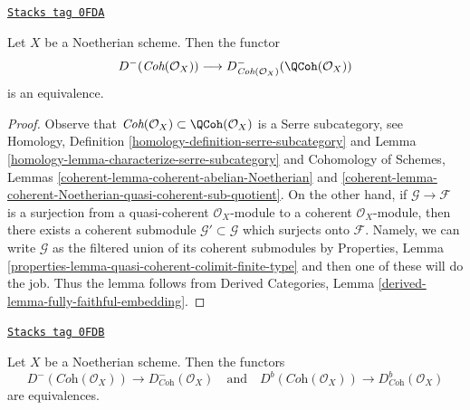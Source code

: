 \begin{lemma}
\label{perfect-lemma-coh-to-qcoh}
\href{https://stacks.math.columbia.edu/tag/0FDA}{\texttt{Stacks tag 0FDA}}

Let $X$ be a Noetherian scheme. Then the functor
$$
D^-(\textit{Coh}(\mathcal{O}_X))
\longrightarrow
D^-_{\textit{Coh}(\mathcal{O}_X)}(\QCoh(\mathcal{O}_X))
$$
is an equivalence.
\end{lemma}

\begin{proof}
Observe that $\textit{Coh}(\mathcal{O}_X) \subset \QCoh(\mathcal{O}_X)$
is a Serre subcategory, see
Homology, Definition \ref{homology-definition-serre-subcategory} and
Lemma \ref{homology-lemma-characterize-serre-subcategory} and
Cohomology of Schemes, Lemmas
\ref{coherent-lemma-coherent-abelian-Noetherian} and
\ref{coherent-lemma-coherent-Noetherian-quasi-coherent-sub-quotient}.
On the other hand, if $\mathcal{G} \to \mathcal{F}$ is a surjection
from a quasi-coherent $\mathcal{O}_X$-module to a coherent
$\mathcal{O}_X$-module, then there exists a coherent submodule
$\mathcal{G}' \subset \mathcal{G}$ which surjects onto $\mathcal{F}$.
Namely, we can write $\mathcal{G}$ as the filtered union of its coherent
submodules by
Properties, Lemma \ref{properties-lemma-quasi-coherent-colimit-finite-type}
and then one of these will do the job.
Thus the lemma follows from
Derived Categories, Lemma \ref{derived-lemma-fully-faithful-embedding}.
\end{proof}

\begin{proposition}[DCoh]
\label{perfect-proposition-DCoh}
\href{https://stacks.math.columbia.edu/tag/0FDB}{\texttt{Stacks tag 0FDB}}

Let $X$ be a Noetherian scheme. Then the functors
$$
D^-(\textit{Coh}(\mathcal{O}_X))
\longrightarrow
D^-_{\textit{Coh}}(\mathcal{O}_X)
\quad\text{and}\quad
D^b(\textit{Coh}(\mathcal{O}_X))
\longrightarrow
D^b_{\textit{Coh}}(\mathcal{O}_X)
$$
are equivalences.
\end{proposition}

